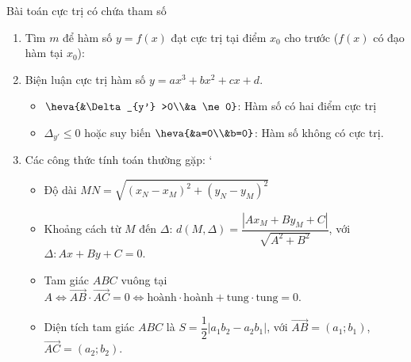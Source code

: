 \begin{dang}{Bài toán cực trị có chứa tham số}
	\begin{enumerate}[\iconCV]
		\item Tìm $m$ để hàm số $y=f(x)$ đạt cực trị tại điểm $x_0$ cho trước ($f(x)$ có đạo hàm tại $x_0$):
	\item Biện luận cực trị hàm số $y=ax^3+bx^2+cx+d$.
	\begin{itemize}
		\item[\ding{172}] $\heva{&\Delta_{y'} >0\\&a \ne 0}$: Hàm số có hai điểm cực trị
		\item[\ding{173}]  $\Delta_{y'} \le 0$ hoặc suy biến $\heva{&a=0\\&b=0}$: Hàm số không có cực trị.
	\end{itemize}
 \item Các công thức tính toán thường gặp:
 `\begin{itemize}
 	\item [\ding{172}] Độ dài $MN=\sqrt{(x_N-x_M)^2+(y_N-y_M)^2}$
 	\item [\ding{173}]  Khoảng cách từ $M$ đến $\Delta$: $d(M,\Delta)=\dfrac{|Ax_M+By_M+C|}{\sqrt{A^2+B^2}}$, với $\Delta \colon Ax+By+C=0$.
 	\item [\ding{174}] Tam giác $ABC$ vuông tại $A \Leftrightarrow \overrightarrow{AB} \cdot \overrightarrow{AC}=0 \Leftrightarrow \text{hoành}\cdot\text{hoành}+\text{tung}\cdot\text{tung}=0$.
 	\item [\ding{175}] Diện tích tam giác $ABC$ là  $S=\dfrac{1}{2}|a_1b_2-a_2b_1|$, với $\overrightarrow{AB}=(a_1;b_1)$, $\overrightarrow{AC}=(a_2;b_2)$.
 \end{itemize}
	\end{enumerate}
\end{dang}
\setcounter{vd}{0}

